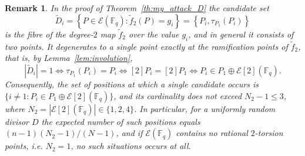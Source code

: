 \documentclass[sn-mathphys-num]{sn-jnl_modified}
\newcommand{\FF}{\ensuremath{\mathbb{F}}}
\newtheorem{remark}{Remark}
\begin{document}
\begin{remark}\label{rem:ramification}
In the proof of Theorem~\ref{th:my_attack_D} the candidate set
\[
\widetilde{D}_i = \left\{ P \in \mathcal{E}(\FF_q) : \widetilde{f}_2(P) = g_i \right\}
= \left\{ P_i, \tau_{P_1}(P_i) \right\}
\]
is the fibre of the degree-$2$ map $\widetilde{f}_2$ over the value $g_i$, and in general it consists of two points. It degenerates to a single point exactly at the ramification points of $\widetilde{f}_2$, that is, by Lemma~\ref{lem:involution},
\[
|\widetilde{D}_i| = 1
\iff \tau_{P_1}(P_i) = P_i
\iff [2]P_i = [2]P_1
\iff P_i \in P_1 \oplus \mathcal{E}[2](\FF_q).
\]
Consequently, the set of positions at which a single candidate occurs is $\{i \neq 1 : P_i \in P_1 \oplus \mathcal{E}[2](\FF_q)\}$, and its cardinality does not exceed $N_2 - 1 \leq 3$, where $N_2 = |\mathcal{E}[2](\FF_q)| \in \{1,2,4\}$. In particular, for a uniformly random divisor $D$ the expected number of such positions equals $(n-1)(N_2-1)/(N-1)$, and if $\mathcal{E}(\FF_q)$ contains no rational $2$-torsion points, i.e. $N_2 = 1$, no such situations occurs at all.
\end{remark}
\end{document}
